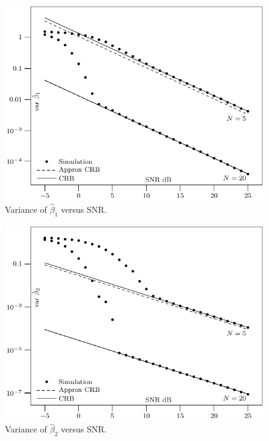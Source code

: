 \documentclass[review]{elsarticle}
\begin{document}
\clearpage

 \begin{figure}[p]
    	\centering 
   		\includegraphics{fig2.pdf} 
    		\caption{Variance of $\hat{\beta}_1$ versus SNR.} 
    		\label{plot:phase1} 
 \end{figure} 

\clearpage

 \begin{figure}[p]
    	\centering 
   		\includegraphics{fig3.pdf} 
    		\caption{Variance of $\hat{\beta}_2$ versus SNR.} 
    		\label{plot:phase2} 
 \end{figure}  
 
\clearpage
\end{document}
